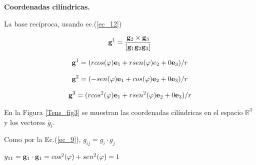 \begin{example} \textbf{Coordenadas cilíndricas.}


La base recíproca, usando ec.(\ref{ec_12})



\begin{eqnarray}\label{ec_32}
 \bold{g}^{1}= \frac {\bold{g}_{2}\times \bold{g}_{3} }{\left[  \bold{g}_{1}\bold{g}_{2} \bold{g}_{3} \right]} 
\end{eqnarray}


\begin{eqnarray}\label{ec_29}
 \bold{g}^{1} = ( r cos(\varphi)  \bold{e}_{1} + r sen (\varphi)  \bold{}{e}_{2}+  0  \bold{e}_{3})/ r 
\end{eqnarray}

\begin{eqnarray}\label{ec_31}
\bold{g}^{2} = ( - sen(\varphi)  \bold{e}_{1} + cos (\varphi)  \bold{e}_{2}+  0  \bold{e}_{3})/ r 
\end{eqnarray}

\begin{eqnarray}\label{ec_33}
\bold{g}^{3} = ( r cos^{2}(\varphi)  \bold{e}_{1} +  r  sen^{2}(\varphi)  \bold{e}_{2}+  0  \bold{e}_{3})/ r 
\end{eqnarray}

\bigskip









En la Figura \ref{Tens_fig3} se muestran las coordenadas cilíndricas en el espacio $\mathbb{R}^{3}$ y los vectores $\overline {g}_{i}$.














\bigskip


Como por la Ec.(\ref{ec_9}),  $g_{ij}= g_{i}\cdot g_{j}$

\bigskip

 $g_{11}= \bold{g}_{1}\cdot \bold{g}_{1}=cos^{2}(\varphi)  + sen^{2}(\varphi)=1$

\bigskip


\end{example}
